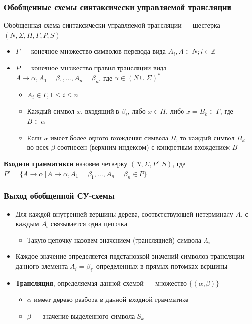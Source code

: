 \documentclass{beamer}
\begin{document}
\begin{frame}[fragile]
  \transwipe[direction=90]
  \frametitle{Обобщенные схемы синтаксически управляемой трансляции}

  \begin{center}
    Обобщенная схема синтаксически управляемой трансляции --- шестерка $(N, \Sigma, \Pi, \Gamma, P, S)$  
  \end{center}

  \begin{itemize}
    \item $\Gamma$ --- конечное множество символов перевода вида $A_i, A \in N; i \in \mathbb{Z}$
    \item $P$ --- конечное множество правил трансляции вида $A \rightarrow 	\alpha, A_1 = \beta_1, \dots, A_n = \beta_n$, где $\alpha \in (N \cup \Sigma)^*$
    \begin{itemize}
      \item $A_i \in \Gamma, 1 \leq i \leq n$
      \item Каждый символ $x$, входящий в $\beta_i$, либо $x \in \Pi$, либо $x = B_k \in \Gamma$, где $B \in \alpha$
      \item Если $\alpha$ имеет более одного вхождения символа $B$, то каждый символ $B_k$ во всех $\beta$ соотнесен (верхним индексом) с конкретным вхождением $B$
    \end{itemize}
  \end{itemize}
  

  \begin{center}
    \textbf{Входной грамматикой} назовем четверку $(N, \Sigma, P', S)$, где $P' = \{ A \rightarrow \alpha \, | \, A \rightarrow \alpha, A_1 = \beta_1, \dots, A_n = \beta_n \in P  \}$
  \end{center}
\end{frame}

\begin{frame}[fragile]
  \transwipe[direction=90]
  \frametitle{Выход обобщенной СУ-схемы}
  \begin{itemize}
    \item Для каждой внутренней вершины дерева, соответствующей нетерминалу $A$, с каждым $A_i$ связывается одна цепочка 
    \begin{itemize}
      \item Такую цепочку назовем значением (трансляцией) символа $A_i$
    \end{itemize}     
    \item Каждое значение определяется подстановкой значений символов трансляции данного элемента $A_i = \beta_i$, определенных в прямых потомках вершины
    \item \textbf{Трансляция}, определяемая данной схемой --- множество $\{(\alpha, \beta)\}$
    \begin{itemize}
      \item $\alpha$ имеет дерево разбора в данной входной грамматике
      \item $\beta$ --- значение выделенного символа $S_k$
    \end{itemize}
  \end{itemize}

\end{frame}
\end{document}
